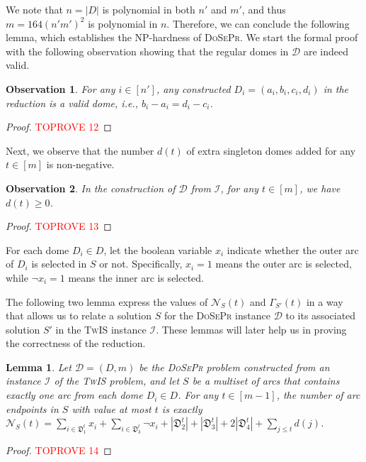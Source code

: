 \documentclass[letterpaper,11pt]{article}
\newtheorem{observation}{Observation}[section]
\newtheorem{lemma}[theorem]{Lemma}
\newcommand{\tis}{\textsc{TwIS}\xspace}
\newcommand{\dspr}{\textsc{DoSePr}\xspace}
\begin{document}
We note that $n=|D|$ is polynomial in both $n'$ and $m'$, and thus $m=164(n'm')^2$ is polynomial in $n$. Therefore, we can conclude the following lemma, which establishes the NP-hardness of \dspr. We start the formal proof with the following observation showing that the regular domes in $\mathcal{D}$ are indeed valid. 

\begin{observation}\label{obs:indeeddome}
For any $i\in[n']$, any constructed $D_i = (a_i,b_i,c_i,d_i)$ in the reduction is a valid dome, i.e., $b_i - a_i = d_i - c_i$. 
\end{observation}
\begin{proof}\textcolor{red}{TOPROVE 12}\end{proof}


Next, we observe that the number $d(t)$ of extra singleton domes added for any $t\in [m]$ is non-negative.

\begin{observation}\label{obs:dt_nonnegative}
   In the construction of $\mathcal{D}$ from $\mathcal{I}$, for any $t\in [m]$, we have $d(t) \geq 0$. 
\end{observation}
\begin{proof}\textcolor{red}{TOPROVE 13}\end{proof}

For each dome $D_i \in D$, let the boolean variable $x_i$ indicate whether the outer arc of $D_i$ is selected in $S$ or not. Specifically, $x_i = 1$ means the outer arc is selected, while $\neg{x_i} = 1$ means the inner arc is selected. 

The following two lemma express the values of $\mathcal{N}_S(t)$ and $\Gamma_{S'}(t)$ in a way that allows us to relate a solution $S$ for the \dspr instance $\mathcal{D}$ to its associated solution $S'$ in the \tis instance $\mathcal{I}$. These lemmas will later help us in proving the correctness of the reduction. 

\begin{lemma}
\label{lemma:tool:TIS2DOME}
Let $\mathcal{D}=(D,m)$ be the \dspr problem constructed from an instance $\mathcal{I}$ of the \tis problem, and let $S$ be a multiset of arcs that contains exactly one arc from each dome $D_i \in D$. For any $t\in[m-1]$, the number of arc endpoints in $S$ with value at most $t$ is exactly $\mathcal{N}_S(t) = \sum_{i \in \mathfrak{D}_1^t} x_i + \sum_{i \in \mathfrak{D}_3^t} \neg{x_i} +|\mathfrak{D}_2^t| +|\mathfrak{D}_3^t| + 2|\mathfrak{D}_4^t| + \sum_{j \leq t} d(j)$.
\end{lemma}
\begin{proof}\textcolor{red}{TOPROVE 14}\end{proof}
\end{document}
